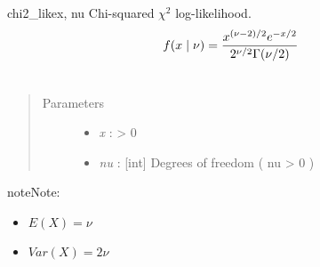 \hypertarget{pymc.distributions.chi2_like}{}\begin{funcdesc}{chi2\_like}{x, nu}
Chi-squared $\chi^2$ log-likelihood.
\begin{gather}
\begin{split}f(x \mid \nu) = \frac{x^{(\nu-2)/2}e^{-x/2}}{2^{\nu/2}\Gamma(\nu/2)}\end{split}\notag\\\begin{split}\end{split}\notag
\end{gather}\begin{quote}\begin{description}
\item[Parameters] \leavevmode\begin{itemize}
\item {} 
\emph{x} : \textgreater{} 0

\item {} 
\emph{nu} : {[}int{]} Degrees of freedom ( nu \textgreater{} 0 )

\end{itemize}

\end{description}\end{quote}

\begin{notice}{note}{Note:}\begin{itemize}
\item {} 
$E(X)=\nu$

\item {} 
$Var(X)=2\nu$

\end{itemize}
\end{notice}
\end{funcdesc}

